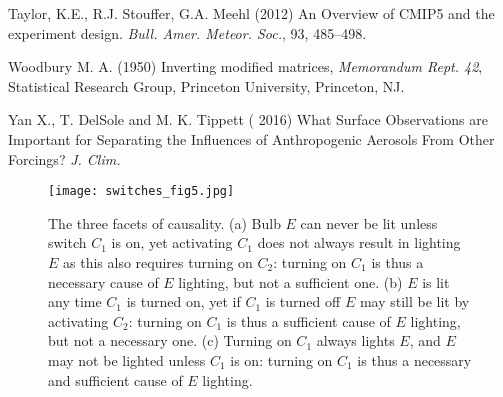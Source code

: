 \documentclass[12pt]{article}
\begin{document}
\begin{thebibliography}{00}
Taylor, K.E., R.J. Stouffer, G.A. Meehl (2012) An Overview of CMIP5 and the experiment design. {\em Bull. Amer. Meteor. Soc.}, 93, 485--498.

Woodbury M. A. (1950) Inverting modified matrices, {\em Memorandum Rept. 42}, Statistical Research Group, Princeton University, Princeton, NJ.

Yan X., T. DelSole and M. K. Tippett ( 2016) What Surface Observations are Important for Separating the Influences of Anthropogenic Aerosols From Other Forcings? {\em J. Clim.}

\end{thebibliography}


\begin{figure}[t]
\begin{center} 
\noindent\texttt{[image: switches\_fig5.jpg]}
\end{center} 
\caption{The three facets of causality. (a) Bulb $E$ can never be lit unless switch $C_1$ is on, yet activating $C_1$ does not always result in lighting $E$ as this also requires turning on $C_2$: turning on $C_1$ is thus a necessary cause of $E$ lighting, but not a sufficient one. (b) $E$ is lit any time $C_1$ is turned on, yet if $C_1$ is turned off $E$ may still be lit by activating $C_2$: turning on $C_1$ is thus a sufficient cause of $E$ lighting, but not a necessary one. (c) Turning on $C_1$ always lights $E$, and $E$ may not be lighted unless $C_1$ is on: turning on $C_1$ is thus a necessary and sufficient cause of $E$ lighting.}
\label{f1}
\end{figure}

\end{document}
